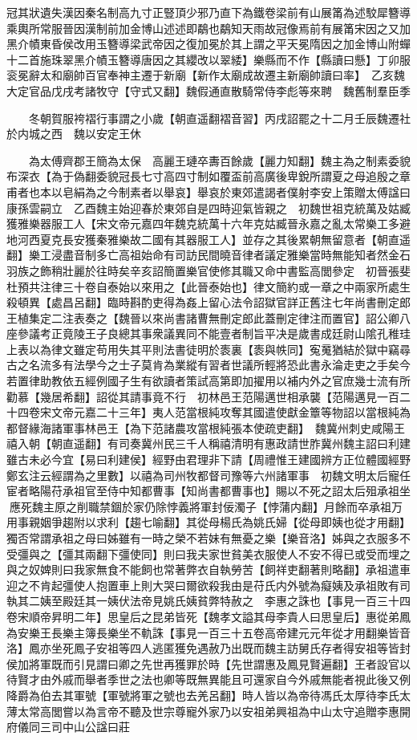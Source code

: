 冠其狀遺失漢因秦名制高九寸正豎頂少邪乃直下為鐵卷梁前有山展筩為述駮犀簪導乘輿所常服晉因漢制前加金博山述述即鷸也鷸知天雨故冠像焉前有展筩宋因之又加黑介幘東昏侯改用玉簪導梁武帝因之復加冕於其上謂之平天冕隋因之加金博山附蟬十二首施珠翠黑介幘玉簪導唐因之其纓改以翠緌】樂縣而不作【縣讀曰懸】丁卯服衮冕辭太和廟帥百官奉神主遷于新廟【新作太廟成故遷主新廟帥讀曰率】　乙亥魏大定官品戊戌考諸牧守【守式又翻】魏假通直散騎常侍李彪等來聘　魏舊制羣臣季

　　冬朝賀服袴褶行事謂之小歲【朝直遥翻褶音習】丙戌詔罷之十二月壬辰魏遷社於内城之西　魏以安定王休

　　為太傅齊郡王簡為太保　高麗王璉卒夀百餘歲【麗力知翻】魏主為之制素委貌布深衣【為于偽翻委貌冠長七寸高四寸制如覆盃前高廣後卑銳所謂夏之母追殷之章甫者也本以皂絹為之今制素者以舉哀】舉哀於東郊遣謁者僕射李安上策贈太傅諡曰康孫雲嗣立　乙酉魏主始迎春於東郊自是四時迎氣皆親之　初魏世祖克統萬及姑臧獲雅樂器服工人【宋文帝元嘉四年魏克統萬十六年克姑臧晉永嘉之亂太常樂工多避地河西夏克長安獲秦雅樂故二國有其器服工人】並存之其後累朝無留意者【朝直遥翻】樂工浸盡音制多亡高祖始命有司訪民間曉音律者議定雅樂當時無能知者然金石羽族之飾稍壯麗於往時矣辛亥詔簡置樂官使修其職又命中書監高閭參定　初晉張斐杜預共注律三十卷自泰始以來用之【此晉泰始也】律文簡約或一章之中兩家所處生殺頓異【處昌呂翻】臨時斟酌吏得為姦上留心法令詔獄官詳正舊注七年尚書刪定郎王植集定二注表奏之【魏晉以來尚書諸曹無刪定郎此蓋刪定律注而置官】詔公卿八座參議考正竟陵王子良總其事衆議異同不能壹者制旨平决是歲書成廷尉山隂孔稚珪上表以為律文雖定苟用失其平則法書徒明於袠裏【袠與帙同】寃䰟猶結於獄中竊尋古之名流多有法學今之士子莫肯為業縱有習者世議所輕將恐此書永淪走吏之手矣今若置律助教依五經例國子生有欲讀者策試高第即加擢用以補内外之官庶幾士流有所勸慕【幾居希翻】詔從其請事竟不行　初林邑王范陽邁世相承襲【范陽邁見一百二十四卷宋文帝元嘉二十三年】夷人范當根純攻奪其國遣使獻金簟等物詔以當根純為都督緣海諸軍事林邑王【為下范諸農攻當根純張本使疏吏翻】　魏冀州刺史咸陽王禧入朝【朝直遥翻】有司奏冀州民三千人稱禧清明有惠政請世胙冀州魏主詔曰利建雖古未必今宜【易曰利建侯】經野由君理非下請【周禮惟王建國辨方正位體國經野鄭玄注云經謂為之里數】以禧為司州牧都督司豫等六州諸軍事　初魏文明太后寵任宦者略陽苻承祖官至侍中知都曹事【知尚書都曹事也】賜以不死之詔太后殂承祖坐應死魏主原之削職禁錮於家仍除悖義將軍封佞濁子【悖蒲内翻】月餘而卒承祖万用事親姻爭趨附以求利【趨七喻翻】其從母楊氏為姚氏婦【從母即姨也從才用翻】獨否常謂承祖之母曰姊雖有一時之榮不若妹有無憂之樂【樂音洛】姊與之衣服多不受彊與之【彊其兩翻下彊使同】則曰我夫家世貧美衣服使人不安不得已或受而埋之與之奴婢則曰我家無食不能飼也常著弊衣自執勞苦【飼祥吏翻著則略翻】承祖遣車迎之不肯起彊使人抱置車上則大哭曰爾欲殺我由是苻氏内外號為癡姨及承祖敗有司執其二姨至殿廷其一姨伏法帝見姚氏姨貧弊特赦之　李惠之誅也【事見一百三十四卷宋順帝昇明二年】思皇后之昆弟皆死【魏孝文謚其母李貴人曰思皇后】惠從弟鳳為安樂王長樂主簿長樂坐不軌誅【事見一百三十五卷高帝建元元年從才用翻樂皆音洛】鳳亦坐死鳳子安祖等四人逃匿獲免遇赦乃出既而魏主訪舅氏存者得安祖等皆封侯加將軍既而引見謂曰卿之先世再獲罪於時【先世謂惠及鳳見賢遍翻】王者設官以待賢才由外戚而舉者季世之法也卿等既無異能且可還家自今外戚無能者視此後又例降爵為伯去其軍號【軍號將軍之號也去羌呂翻】時人皆以為帝待馮氏太厚待李氏太薄太常高閭嘗以為言帝不聽及世宗尊寵外家乃以安祖弟興祖為中山太守追贈李惠開府儀同三司中山公諡曰莊

